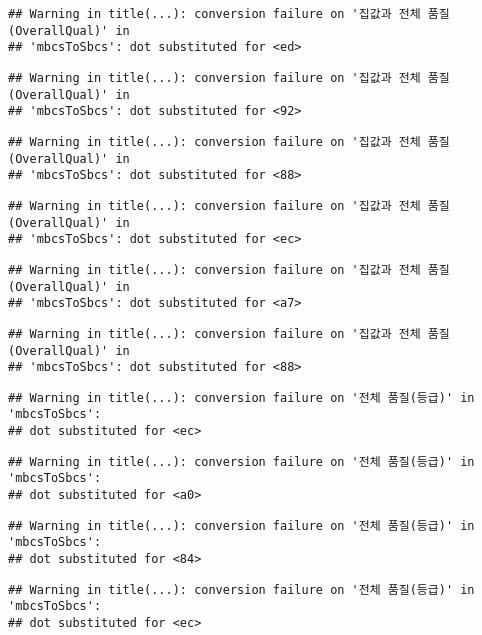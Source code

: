 \documentclass[
]{article}
\begin{document}
\begin{verbatim}
## Warning in title(...): conversion failure on '집값과 전체 품질(OverallQual)' in
## 'mbcsToSbcs': dot substituted for <ed>
\end{verbatim}

\begin{verbatim}
## Warning in title(...): conversion failure on '집값과 전체 품질(OverallQual)' in
## 'mbcsToSbcs': dot substituted for <92>
\end{verbatim}

\begin{verbatim}
## Warning in title(...): conversion failure on '집값과 전체 품질(OverallQual)' in
## 'mbcsToSbcs': dot substituted for <88>
\end{verbatim}

\begin{verbatim}
## Warning in title(...): conversion failure on '집값과 전체 품질(OverallQual)' in
## 'mbcsToSbcs': dot substituted for <ec>
\end{verbatim}

\begin{verbatim}
## Warning in title(...): conversion failure on '집값과 전체 품질(OverallQual)' in
## 'mbcsToSbcs': dot substituted for <a7>
\end{verbatim}

\begin{verbatim}
## Warning in title(...): conversion failure on '집값과 전체 품질(OverallQual)' in
## 'mbcsToSbcs': dot substituted for <88>
\end{verbatim}

\begin{verbatim}
## Warning in title(...): conversion failure on '전체 품질(등급)' in 'mbcsToSbcs':
## dot substituted for <ec>
\end{verbatim}

\begin{verbatim}
## Warning in title(...): conversion failure on '전체 품질(등급)' in 'mbcsToSbcs':
## dot substituted for <a0>
\end{verbatim}

\begin{verbatim}
## Warning in title(...): conversion failure on '전체 품질(등급)' in 'mbcsToSbcs':
## dot substituted for <84>
\end{verbatim}

\begin{verbatim}
## Warning in title(...): conversion failure on '전체 품질(등급)' in 'mbcsToSbcs':
## dot substituted for <ec>
\end{verbatim}
\end{document}
